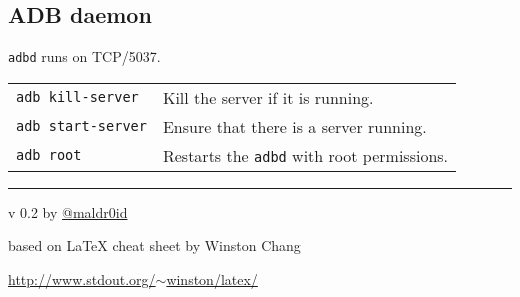 \documentclass[11pt,landscape,a4paper]{article}
\begin{document}
\begin{multicols}{3}
\subsection{ADB daemon}
\texttt{adbd} runs on TCP/5037.

\vspace*{1mm}

\begin{tabular}{@{}ll@{}}

\texttt{adb kill-server}  & Kill the server if it is running.\\
\texttt{adb start-server} & Ensure that there is a server running.\\
\texttt{adb root} & Restarts the \texttt{adbd} with root permissions.\\
\end{tabular}

\rule{0.3\linewidth}{0.25pt}
\scriptsize

v 0.2 by \href{http://www.twitter.com/maldr0id}{@maldr0id}

based on \LaTeX{} cheat sheet by Winston Chang

\href{http://www.stdout.org/~winston/latex/}{http://www.stdout.org/$\sim$winston/latex/}


\end{multicols}
\end{document}
